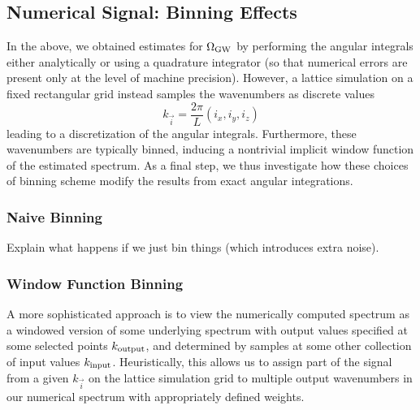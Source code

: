 \documentclass{revtex4}
\begin{document}
\subsection{Numerical Signal: Binning Effects}
In the above, we obtained estimates for $\Omega_{\rm GW}$ by performing the angular integrals either analytically or using a quadrature integrator (so that numerical errors are present only at the level of machine precision).
However, a lattice simulation on a fixed rectangular grid instead samples the wavenumbers as discrete values
\begin{equation}
  k_{\vec{i}} = \frac{2\pi}{L}\left(i_x,i_y,i_z\right)
\end{equation}
leading to a discretization of the angular integrals.
Furthermore, these wavenumbers are typically binned, inducing a nontrivial implicit window function of the estimated spectrum.
As a final step, we thus investigate how these choices of binning scheme modify the results from exact angular integrations.

\subsubsection{Naive Binning}
Explain what happens if we just bin things (which introduces extra noise).

\subsubsection{Window Function Binning}
A more sophisticated approach is to view the numerically computed spectrum as a windowed version of some underlying spectrum with output values specified at some selected points $k_{\rm output}$, and determined by samples at some other collection of input values $k_{\rm input}$.
Heuristically, this allows us to assign part of the signal from a given $k_{\vec{i}}$ on the lattice simulation grid to multiple output wavenumbers in our numerical spectrum with appropriately defined weights.
\end{document}
